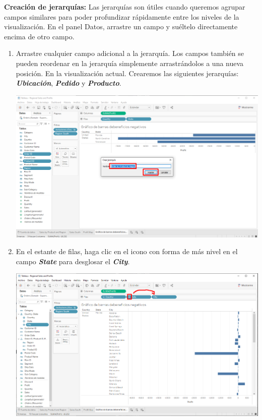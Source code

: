 \documentclass[12pt,letterpaper]{article}
\begin{document}
\begin{enumerate}
\begin{center}
        \end{center}
    \end{enumerate}
    \textbf{Creación de jerarquías:} Las jerarquías son útiles cuando queremos agrupar campos similares para poder profundizar rápidamente entre los niveles de la visualización. En el panel Datos, arrastre un campo y suéltelo directamente encima de otro campo.
    \begin{enumerate}
        \item Arrastre cualquier campo adicional a la jerarquía. Los campos también se pueden reordenar en la jerarquía simplemente arrastrándolos a una nueva posición. En la visualización actual. Crearemos las siguientes jerarquías: \textit{\textbf{Ubicación}}, \textit{\textbf{Pedido}} y \textit{\textbf{Producto}}.
        \begin{center}
            \includegraphics[width=15cm]{./img/img46.png}
        \end{center}
        \item En el estante de filas, haga clic en el icono con forma de más nivel en el campo \textit{\textbf{State}} para desglosar el \textit{\textbf{City}}.      
        \begin{center}
            \includegraphics[width=15cm]{./img/img47.png}

\end{center}
\end{enumerate}
\end{document}
